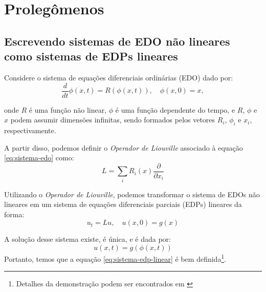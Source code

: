 \documentclass[12pt]{article}
\begin{document}

\section{Prolegômenos}
\subsection{Escrevendo sistemas de EDO não lineares como sistemas de EDPs lineares}

Considere o sistema de equações diferenciais ordinárias (EDO) dado por:
\begin{equation}
	\frac{d}{dt} \phi(x,t) = R(\phi(x,t)), \quad \phi(x, 0) = x,
	\label{eq:sistema-edo}
\end{equation}

onde $R$ é uma função não linear, $\phi$ é uma função dependente do tempo, e $R$, $\phi$ e $x$ podem assumir dimensões infinitas, sendo formados pelos vetores $R_i$, $\phi_i$ e $x_i$, respectivamente.

A partir disso, podemos definir o \textit{Operador de Liouville} associado à equação \eqref{eq:sistema-edo} como:
\begin{equation}
	L = \sum_i R_i(x) \frac{\partial}{\partial x_i}
	\label{eq:liouville-operator}
\end{equation}

Utilizando o \textit{Operador de Liouville}, podemos transformar o sistema de EDOs não lineares em um sistema de equações diferenciais parciais (EDPs) lineares da forma:
\begin{equation}
	u_t = Lu, \quad u(x,0) = g(x)
	\label{eq:sistema-edp-linear}
\end{equation}

A solução desse sistema existe, é única, e é dada por:
\begin{equation}
	u(x,t) = g(\phi(x,t))   
	\label{eq:solucao-sistema-edp-linear}
\end{equation}
Portanto, temos que a equação \eqref{eq:sistema-edp-linear} é bem definida\footnote{Detalhes da demonstração podem ser encontrados em \citet[p.~181-182]{Chorin2013}}.
\end{document}
